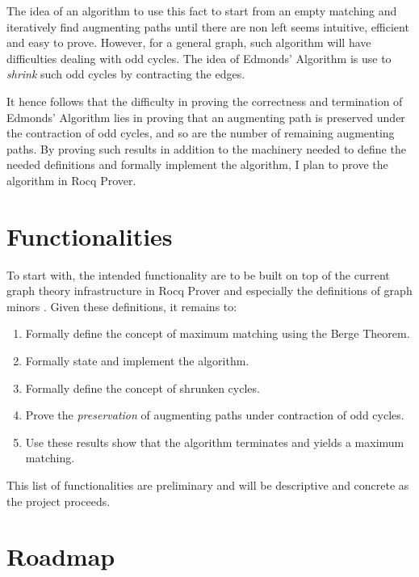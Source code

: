 \documentclass[acmsmall, screen, nonacm]{acmart}
\begin{document}
The idea of an algorithm to use this fact to start from an empty matching and iteratively find augmenting paths until there are non left seems intuitive, efficient and easy to prove. However, for a general graph, such algorithm will have difficulties dealing with odd cycles. The idea of Edmonds' Algorithm is use to \textit{shrink} such odd cycles by contracting the edges. 

It hence follows that the difficulty in proving the correctness and termination of Edmonds' Algorithm lies in proving that an augmenting path is preserved under the contraction of odd cycles, and so are the number of remaining augmenting paths. By proving such results in addition to the machinery needed to define the needed definitions and formally implement the algorithm, I plan to prove the algorithm in Rocq Prover.

\section{Functionalities}

To start with, the intended functionality are to be built on top of the current graph theory infrastructure in Rocq Prover and especially the definitions of graph minors \cite{CoqGraph}. Given these definitions, it remains to:
\begin{enumerate}
	\item Formally define the concept of maximum matching using the Berge Theorem.
	\item Formally state and implement the algorithm.
	\item Formally define the concept of shrunken cycles.
	\item Prove the \textit{preservation} of augmenting paths under contraction of odd cycles.
	\item Use these results show that the algorithm terminates and yields a maximum matching.
\end{enumerate}

This list of functionalities are preliminary and will be descriptive and concrete as the project proceeds.

\section{Roadmap}




{}
\end{document}

